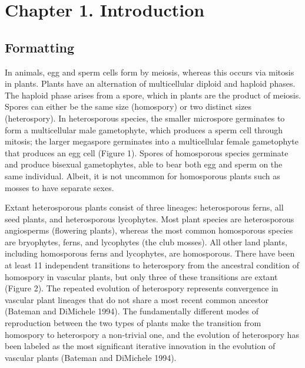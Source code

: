 
\chapter{Chapter 1. Introduction}%

\section{Formatting}

In animals, egg and sperm cells form by meiosis, whereas this occurs via mitosis in plants. Plants have an alternation of multicellular diploid and haploid phases. The haploid phase arises from a spore, which in plants are the product of meiosis. Spores can either be the same size (homospory) or two distinct sizes (heterospory). In heterosporous species, the smaller microspore germinates to form a multicellular male gametophyte, which produces a sperm cell through mitosis; the larger megaspore germinates into a multicellular female gametophyte that produces an egg cell (Figure 1). Spores of homosporous species germinate and produce bisexual gametophytes, able to bear both egg and sperm on the same individual. Albeit, it is not uncommon for homosporous plants such as mosses to have separate sexes.

Extant heterosporous plants consist of three lineages: heterosporous ferns, all seed plants, and heterosporous lycophytes. Most plant species are heterosporous angiosperms (flowering plants), whereas the most common homosporous species are bryophytes, ferns, and lycophytes (the club mosses). All other land plants, including homosporous ferns and lycophytes, are homosporous. There have been at least 11 independent transitions to heterospory from the ancestral condition of homospory in vascular plants, but only three of these transitions are extant (Figure 2). The repeated evolution of heterospory represents convergence in vascular plant lineages that do not share a most recent common ancestor (Bateman and DiMichele 1994). The fundamentally different modes of reproduction between the two types of plants make the transition from homospory to heterospory a non-trivial one, and the evolution of heterospory has been labeled as the most significant iterative innovation in the evolution of vascular plants (Bateman and DiMichele 1994).

